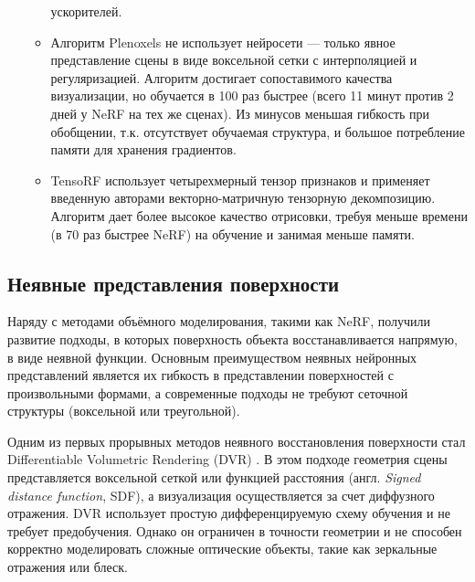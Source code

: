 \begin{itemize}
\begin{itemize}
		ускорителей.
		\item Алгоритм Plenoxels \cite{yu2021plenoxelsradiancefieldsneural} не использует
		нейросети — только явное представление сцены в виде воксельной сетки с
		интерполяцией и регуляризацией. Алгоритм достигает сопоставимого качества
		визуализации, но обучается в 100 раз быстрее (всего 11 минут против 2 дней у
		NeRF на тех же сценах). Из минусов меньшая гибкость при обобщении, т.к.
		отсутствует обучаемая структура, и большое потребление памяти для
		хранения градиентов.
		\item TensoRF \cite{chen2022tensorftensorialradiancefields} использует
		четырехмерный тензор признаков и применяет введенную авторами
		векторно-матричную тензорную декомпозицию. Алгоритм дает более высокое качество отрисовки,
		требуя меньше времени (в 70 раз быстрее NeRF) на обучение и занимая меньше памяти.
	\end{itemize}
\end{itemize}

\subsection{Неявные представления поверхности}

Наряду с методами объёмного моделирования, такими как NeRF, получили развитие
подходы, в которых поверхность объекта восстанавливается напрямую, в виде
неявной функции. Основным преимуществом неявных нейронных представлений является
их гибкость в представлении поверхностей с произвольными формами,
а современные подходы не требуют сеточной структуры (воксельной или треугольной).

Одним из первых прорывных методов неявного восстановления поверхности стал
Differentiable Volumetric Rendering (DVR)
\cite{niemeyer2020differentiablevolumetricrenderinglearning}. В этом подходе
геометрия сцены представляется воксельной сеткой или функцией расстояния (англ.
\emph{Signed distance function}, SDF), а визуализация осуществляется за счет диффузного
отражения. DVR использует простую дифференцируемую схему обучения и не требует
предобучения.  Однако он ограничен в точности геометрии и не способен корректно
моделировать сложные оптические объекты, такие как зеркальные отражения или блеск.

